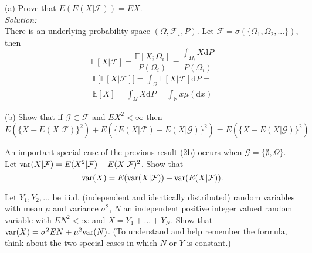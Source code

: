 \documentclass[10pt]{amsart}
\newcommand{\D}{\mathrm{d}}
\begin{document}
 (a) Prove that $E(E(X|\mathcal{F}))=EX$. \\
\textit{Solution:} \\
There is an underlying probability space $(\Omega, \mathcal F_{\star}, P)$.
Let $\mathcal F = \sigma(\{\Omega_1, \Omega_2, ...\})$, then
$$
\mathbb E[X |\mathcal F]
	= \frac{\mathbb E [X; \Omega_i]}{P(\Omega_i)}
	= \frac{\int_{\Omega_i}  X \D P}{P(\Omega_i)}
$$
\begin{align*}
\mathbb E \big[ \mathbb E [X | \mathcal F]\big] = \int_\Omega \mathbb E [X | \mathcal F] \D P =
\end{align*}
\begin{align*}
\mathbb E[X] = \int_\Omega X \D P = \int_{\mathbb R} x \mu(\D x)
\end{align*}

\noindent
(b) Show that if $\mathcal{G}\subset \mathcal{F}$ and $EX^2<\infty$ then
$$E(\{X-E(X|\mathcal{F})\}^2)+ E(\{E(X|\mathcal{F})-E(X|\mathcal{G})\}^2)=E(\{X-E(X|\mathcal{G})\}^2)$$ 

 An important special case of the previous result (2b) occurs when $\mathcal{G} = \{\emptyset, \Omega \}$.  Let ${\rm var}(X|\mathcal{F})=E(X^2|\mathcal{F})-E(X|\mathcal{F})^2$. Show that 
$${\rm var}(X)=E({\rm var}(X|\mathcal{F}))+{\rm var}(E(X|\mathcal{F})).$$


  Let $Y_1, Y_2, . . .$ be i.i.d. (independent and identically distributed) random variables with mean $\mu$ and variance $\sigma^2$, $N$ an independent positive integer valued random variable with $EN^2 < \infty$ and $X = Y_1 +...+Y_N$. Show that ${\rm var}(X) = \sigma^2 EN + \mu^2 {\rm var}(N)$. (To understand and help remember the formula, think about the two special cases in which $N$ or $Y$ is constant.)
\end{document}
